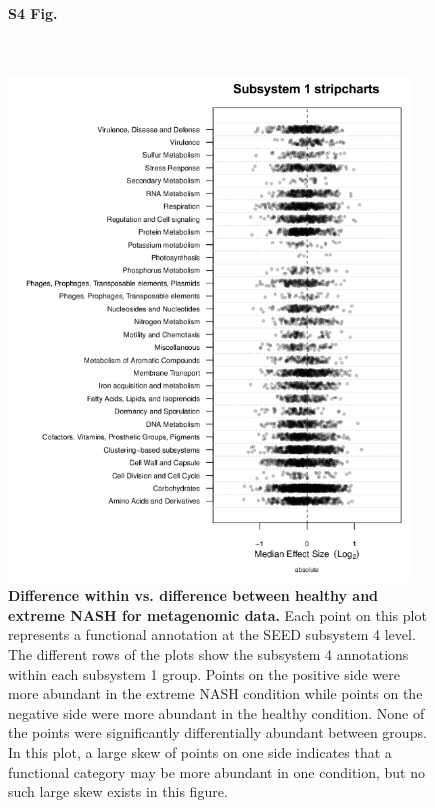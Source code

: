 \begin{figure}[h]
\paragraph*{S4 Fig.}{\mbox{}}\\
\begin{center}
\includegraphics[width=0.95\textwidth]{metagenomic_subsys1.png}
\caption[Difference within vs. difference between healthy and extreme NASH for metagenomic data.]{\textbf{Difference within vs. difference between healthy and extreme NASH for metagenomic data.} Each point on this plot represents a functional annotation at the SEED subsystem 4 level. The different rows of the plots show the subsystem 4 annotations within each subsystem 1 group. Points on the positive side were more abundant in the extreme NASH condition while points on the negative side were more abundant in the healthy condition. None of the points were significantly differentially abundant between groups. In this plot, a large skew of points on one side indicates that a functional category may be more abundant in one condition, but no such large skew exists in this figure.}
\label{nafld_metagenomic_subsys1}
\end{center}
\end{figure}
